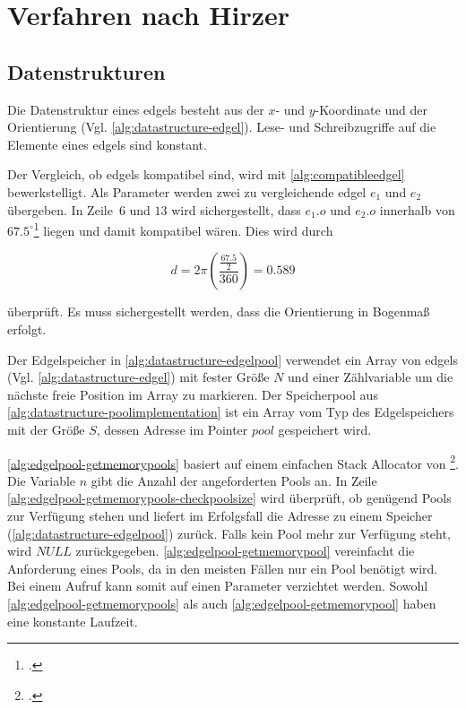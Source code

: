 \section{Verfahren nach Hirzer} %
\label{sec:hirzer}

\subsection{Datenstrukturen} %
\label{sub:datenstrukturen}

Die Datenstruktur eines \glspl{edgel} besteht aus der $x$- und $y$-Koordinate und der Orientierung
 (Vgl. \autoref{alg:datastructure-edgel}). Lese- und Schreibzugriffe auf die Elemente eines \glspl{edgel} sind konstant.



Der Vergleich, ob \glspl{edgel} kompatibel sind, wird mit \autoref{alg:compatibleedgel} bewerkstelligt. Als Parameter
 werden zwei zu vergleichende \gls{edgel} $e_1$ und $e_2$ übergeben. In Zeile~$6$ und $13$ wird sichergestellt, dass
 $e_1.o$ und $e_2.o$ innerhalb von $67.5^\circ$\footcite[Vgl.][S.~417]{clarke96} liegen und damit kompatibel wären.
 Dies wird durch

\begin{equation}
	d = 2 \pi \left( \frac{ \frac{67.5}{2} }{360} \right) = 0.589
\end{equation}

überprüft. Es muss sichergestellt werden, dass die Orientierung in Bogenmaß erfolgt.



Der Edgelspeicher in \autoref{alg:datastructure-edgelpool} verwendet ein Array von \glspl{edgel}
 (Vgl. \autoref{alg:datastructure-edgel}) mit fester Größe $N$ und einer Zählvariable um die nächste freie Position im
 Array zu markieren. Der Speicherpool aus \autoref{alg:datastructure-poolimplementation} ist ein Array vom Typ des
 Edgelspeichers mit der Größe $S$, dessen Adresse im Pointer $\mathit{pool}$ gespeichert wird.



\autoref{alg:edgelpool-getmemorypools} basiert auf einem einfachen Stack Allocator von
 \citeauthor{kr}\footcite[Vgl.][S.~100--104]{kr}. Die Variable $n$ gibt die Anzahl der angeforderten Pools an. In Zeile
 \ref{alg:edgelpool-getmemorypools-checkpoolsize} wird überprüft, ob genügend Pools zur Verfügung stehen und liefert im
 Erfolgsfall die Adresse zu einem Speicher (\autoref{alg:datastructure-edgelpool}) zurück. Falls kein Pool mehr zur
 Verfügung steht, wird $\mathit{NULL}$ zurückgegeben. \autoref{alg:edgelpool-getmemorypool} vereinfacht die Anforderung
 eines Pools, da in den meisten Fällen nur ein Pool benötigt wird. Bei einem Aufruf kann somit auf einen Parameter
 verzichtet werden. Sowohl \autoref{alg:edgelpool-getmemorypools} als auch \autoref{alg:edgelpool-getmemorypool} haben
 eine konstante Laufzeit.

